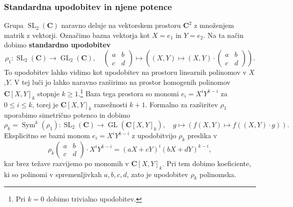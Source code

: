 \documentclass[11pt]{book}
\def\CC{\mathbf{C}}
\DeclareMathOperator\GL{GL}
\DeclareMathOperator\SL{SL}
\DeclareMathOperator\Sym{Sym}
\def\definicija{\color{rdeca}\bf}
\theoremstyle{definition}
\theoremstyle{zgled}
\theoremstyle{zgledbrezstevilke}
\theoremstyle{odprtproblem}
\theoremstyle{domacanaloga}
\theoremstyle{izrek}
\begin{document}
\subsubsection{Standardna upodobitev in njene potence}

Grupa $\SL_2(\CC)$ naravno deluje na vektorskem prostoru $\CC^2$ z množenjem matrik z vektorji. Označimo bazna vektorja kot $X = e_1$ in $Y = e_2$. Na ta način dobimo {\definicija standardno upodobitev}
\[
    \rho_1 \colon {\textstyle \SL_2(\CC) \to \GL_2(\CC)}, \quad
    \begin{pmatrix}
        a & b \\ c & d 
    \end{pmatrix}
    \mapsto \left( (X,Y) \mapsto (X,Y) \cdot \begin{pmatrix}
        a & b \\ c & d 
    \end{pmatrix} \right).
\]
To upodobitev lahko vidimo kot upodobitev na prostoru linearnih polinomov v $X$,$Y$. V tej luči jo lahko naravno razširimo na prostor homogenih polinomov $\CC[X,Y]_k$ stopnje $k \geq 1$.\footnote{Pri $k = 0$ dobimo trivialno upodobitev.} Baza tega prostora so monomi $e_i = X^i Y^{k-i}$ za $0 \leq i \leq k$, torej je $\CC[X,Y]_k$ razsežnosti $k+1$. Formalno za razširitev $\rho_1$ uporabimo simetrično potenco in dobimo
\[
    {\textstyle \rho_k = \Sym^k(\rho_1) \colon \SL_2(\CC) \to \GL(\CC[X,Y]_k),} \quad
    g \mapsto \left( f(X,Y) \mapsto f((X,Y) \cdot g) \right).
\]
Eksplicitno se bazni monom $e_i = X^i Y^{k-i}$ z upodobitvijo $\rho_k$ preslika v
\[
    \rho_k \begin{pmatrix}
        a & b \\ c & d 
    \end{pmatrix}
    \cdot X^i Y^{k-i}
    = (aX + cY)^i (bX + dY)^{k-i},
\]
kar brez težave razvijemo po monomih v $\CC[X,Y]_k$. Pri tem dobimo koeficiente, ki so polinomi v spremenljivkah $a,b,c,d$, zato je upodobitev $\rho_k$ polinomska.
\end{document}
